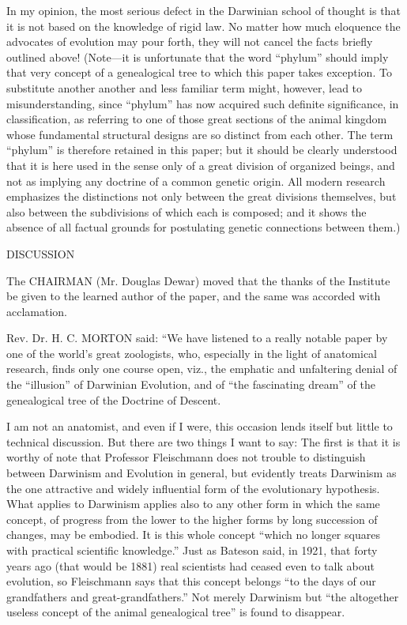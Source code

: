 In my opinion, the most serious defect in the Darwinian school of thought is that it is not
based on the knowledge of rigid law. No matter how much eloquence the advocates of
evolution may pour forth, they will not cancel the facts briefly outlined above!
(Note—it is unfortunate that the word ``phylum'' should imply that very concept of a
genealogical tree to which this paper takes exception. To substitute another another and less
familiar term might, however, lead to misunderstanding, since ``phylum'' has now acquired
such definite significance, in classification, as referring to one of those great sections of the
animal kingdom whose fundamental structural designs are so distinct from each other. The
term ``phylum'' is therefore retained in this paper; but it should be clearly understood that it is
here used in the sense only of a great division of organized beings, and not as implying any
doctrine of a common genetic origin. All modern research emphasizes the distinctions not
only between the great divisions themselves, but also between the subdivisions of which each
is composed; and it shows the absence of all factual grounds for postulating genetic
connections between them.)

DISCUSSION

The CHAIRMAN (Mr. Douglas Dewar) moved that the thanks of the Institute be given to the
learned author of the paper, and the same was accorded with acclamation.

Rev. Dr. H. C. MORTON said: ``We have listened to a really notable paper by one of the
world's great zoologists, who, especially in the light of anatomical research, finds only one
course open, viz., the emphatic and unfaltering denial of the ``illusion'' of Darwinian
Evolution, and of ``the fascinating dream'' of the genealogical tree of the Doctrine of Descent.

I am not an anatomist, and even if I were, this occasion lends itself but little to technical
discussion. But there are two things I want to say: The first is that it is worthy of note that
Professor Fleischmann does not trouble to distinguish between Darwinism and Evolution in
general, but evidently treats Darwinism as the one attractive and widely influential form of
the evolutionary hypothesis. What applies to Darwinism applies also to any other form in
which the same concept, of progress from the lower to the higher forms by long succession
of changes, may be embodied. It is this whole concept ``which no longer squares with
practical scientific knowledge.'' Just as Bateson said, in 1921, that forty years ago (that would
be 1881) real scientists had ceased even to talk about evolution, so Fleischmann says that this
concept belongs ``to the days of our grandfathers and great-grandfathers.'' Not merely
Darwinism but ``the altogether useless concept of the animal genealogical tree'' is found to
disappear.

